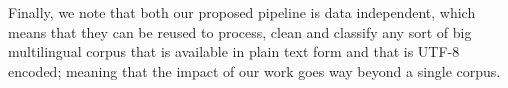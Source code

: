 Finally, we note that both our proposed pipeline is data independent, which means that they can be reused to process, clean and classify any sort of big multilingual corpus that is available in plain text form and that is UTF-8 encoded; meaning that the impact of our work goes way beyond a single corpus.